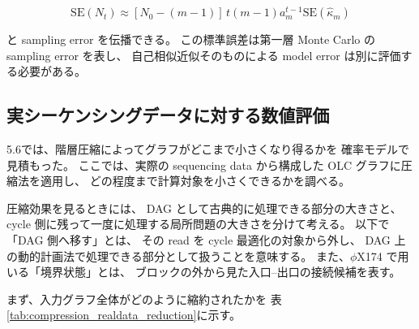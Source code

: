 \documentclass[a4j,10pt]{ujarticle}
\begin{document}
\[
\mathrm{SE}(N_t)
\approx
[N_0-(m-1)]\,t(m-1)a_m^{t-1}
\mathrm{SE}(\widehat\kappa_m)
\]

と sampling error を伝播できる。
この標準誤差は第一層 Monte Carlo の sampling error を表し、
自己相似近似そのものによる model error は別に評価する必要がある。


\subsection{実シーケンシングデータに対する数値評価}
\label{subsec:realdata_compression}

5.6では、階層圧縮によってグラフがどこまで小さくなり得るかを
確率モデルで見積もった。
ここでは、実際の sequencing data から構成した OLC グラフに圧縮法を適用し、
どの程度まで計算対象を小さくできるかを調べる。

圧縮効果を見るときには、
DAG として古典的に処理できる部分の大きさと、
cycle 側に残って一度に処理する局所問題の大きさを分けて考える。
以下で「DAG 側へ移す」とは、
その read を cycle 最適化の対象から外し、
DAG 上の動的計画法で処理できる部分として扱うことを意味する。
また、$\phi$X174 で用いる「境界状態」とは、
ブロックの外から見た入口--出口の接続候補を表す。

まず、入力グラフ全体がどのように縮約されたかを
表\ref{tab:compression_realdata_reduction}に示す。
\end{document}
